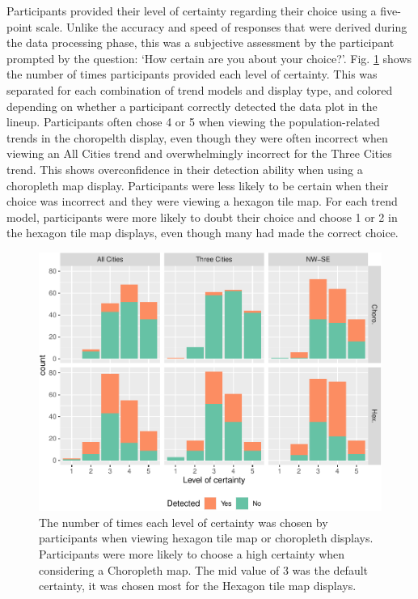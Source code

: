 \documentclass[journal]{vgtc}                     %
\begin{document}
Participants provided their level of certainty regarding their choice using a five-point scale.
Unlike the accuracy and speed of responses that were derived during the data processing phase, this was a subjective
assessment by the participant prompted by the question: `How certain are you about your choice?'.
Fig. \ref{fig:certainty} shows the number of times participants provided each level of certainty. This was separated for each combination of trend models and display type, and colored depending on whether a participant correctly detected the data plot in the lineup.
Participants often chose 4 or 5 when viewing the population-related trends in the choropelth display, even though they were often incorrect when viewing an All Cities trend and overwhelmingly incorrect for the Three Cities trend. This shows overconfidence in their detection ability when using a choropleth map display. Participants were less likely to be certain when their choice was incorrect and they were viewing a hexagon tile map.
For each trend model, participants were more likely to doubt their choice and choose 1 or 2 in the hexagon tile map displays, even though many had made the correct choice.

\begin{figure}
\includegraphics[width=1\linewidth]{paper_files/figure-latex/certainty-1} \caption{The number of times each level of certainty was chosen by participants when viewing hexagon tile map or choropleth displays. Participants were more likely to choose a high certainty when considering a Choropleth map. The mid value of 3 was the default certainty, it was chosen most for the Hexagon tile map displays.}\label{fig:certainty}
\end{figure}
\end{document}
